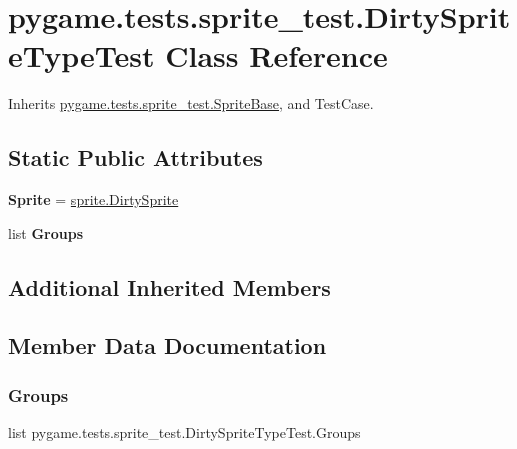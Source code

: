 \hypertarget{classpygame_1_1tests_1_1sprite__test_1_1_dirty_sprite_type_test}{}\section{pygame.\+tests.\+sprite\+\_\+test.\+Dirty\+Sprite\+Type\+Test Class Reference}
\label{classpygame_1_1tests_1_1sprite__test_1_1_dirty_sprite_type_test}


Inherits \hyperlink{classpygame_1_1tests_1_1sprite__test_1_1_sprite_base}{pygame.\+tests.\+sprite\+\_\+test.\+Sprite\+Base}, and Test\+Case.

\subsection*{Static Public Attributes}
\begin{DoxyCompactItemize}
\item 
\mbox{\label{classpygame_1_1tests_1_1sprite__test_1_1_dirty_sprite_type_test_ac81b97c827f3df7e58f1bc85a24e1bf1}} 
{\bfseries Sprite} = \hyperlink{classpygame_1_1sprite_1_1_dirty_sprite}{sprite.\+Dirty\+Sprite}
\item 
list {\bfseries Groups}
\end{DoxyCompactItemize}
\subsection*{Additional Inherited Members}


\subsection{Member Data Documentation}
\mbox{\label{classpygame_1_1tests_1_1sprite__test_1_1_dirty_sprite_type_test_a5ee970652ba219a79c0f85f2b517ea15}} 
\subsubsection{\texorpdfstring{Groups}{Groups}}
{\footnotesize\ttfamily list pygame.\+tests.\+sprite\+\_\+test.\+Dirty\+Sprite\+Type\+Test.\+Groups\hspace{0.3cm}{\ttfamily [static]}}

